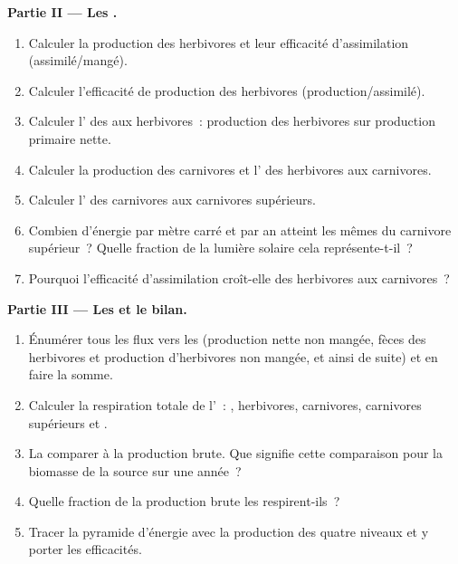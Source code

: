 \begin{problem}
\medskip
\noindent\textbf{Partie II --- Les .}
\begin{enumerate}[resume]
  \item Calculer la production des herbivores et leur efficacité
        d'assimilation (assimilé/mangé).
  \item Calculer l'efficacité de production des herbivores
        (production/assimilé).
  \item Calculer l' des  aux
        herbivores~: production des herbivores sur production primaire
        nette.
  \item Calculer la production des carnivores et l' des herbivores aux carnivores.
  \item Calculer l' des carnivores aux carnivores
        supérieurs.
  \item Combien d'énergie par mètre carré et par an atteint les 
        mêmes du carnivore supérieur~? Quelle fraction de la lumière
        solaire cela représente-t-il~?
  \item Pourquoi l'efficacité d'assimilation croît-elle des herbivores
        aux carnivores~?
\end{enumerate}

\medskip
\noindent\textbf{Partie III --- Les  et le bilan.}
\begin{enumerate}[resume]
  \item Énumérer tous les flux vers les  (production nette
        non mangée, fèces des herbivores et production d'herbivores non
        mangée, et ainsi de suite) et en faire la somme.
  \item Calculer la respiration totale de l'~: ,
        herbivores, carnivores, carnivores supérieurs et .
  \item La comparer à la production brute. Que signifie cette
        comparaison pour la biomasse de la source sur une année~?
  \item Quelle fraction de la production brute les 
        respirent-ils~?
  \item Tracer la pyramide d'énergie avec la production des quatre
        niveaux et y porter les efficacités.
\end{enumerate}


\end{problem}
